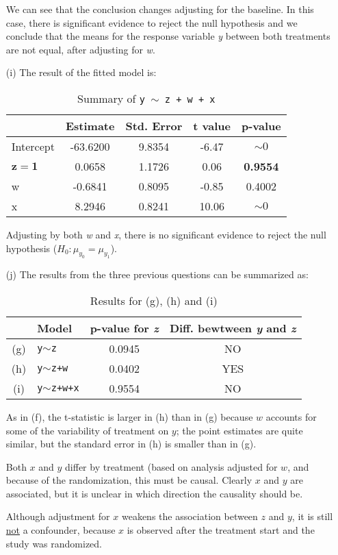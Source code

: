 \documentclass[11pt,a4paper]{article}
\begin{document}
\begin{enumerate}
We can see that the conclusion changes adjusting for the baseline. In this case, there is significant evidence to 
reject the null hypothesis and we conclude that the means for the response variable \emph{y} between both treatments are not equal, 
after adjusting for \emph{w}.

\item[(i)]
The result of the fitted model is:
\begin{table}[h!]
\centering
\begin{tabular}{lcccc}
  \hline
 & Estimate & Std. Error & t value & p-value \\ 
  \hline
Intercept & -63.6200 & 9.8354 & -6.47 & $\sim 0$ \\ 
 $\mathbf{z=1}$ & 0.0658 & 1.1726 & 0.06 & \textbf{0.9554} \\ 
  w & -0.6841 & 0.8095 & -0.85 & 0.4002 \\ 
  x & 8.2946 & 0.8241 & 10.06 & $\sim 0$ \\ 
   \hline
\end{tabular}
\caption{Summary of \texttt{y $\sim$ z + w + x} }
\end{table}

Adjusting by both \emph{w} and \emph{x}, there is no significant evidence to reject the null hypothesis ($H_0:\mu_{y_0} =\mu_{y_1}$). 

\item[(j)]
The results from the three previous questions can be summarized as:

\begin{table}[h!]
\centering
\begin{tabular}{clcc}
\hline
 & Model & p-value for \emph{z} & Diff. bewtween \emph{y} and \emph{z}\\
\hline
(g) & \texttt{y$\sim$z} & 0.0945 & NO\\
(h) & \texttt{y$\sim$z+w} & 0.0402 & YES\\
(i) & \texttt{y$\sim$z+w+x} & 0.9554 & NO\\
\hline
\end{tabular}
\caption{Results for (g), (h) and (i)}
\end{table}

As in (f), the t-statistic is larger in (h) than in (g) because $w$ accounts for some of the variability of treatment on 
$y$; the point estimates are quite similar, but the standard error in (h) is smaller than in (g).

Both $x$ and $y$ differ by treatment (based on analysis adjusted for $w$, and because of the randomization, this
must be causal. Clearly $x$ and $y$ are associated, but it is unclear in which direction the causality should be.

Although adjustment for $x$ weakens the association between $z$ and $y$, it is still {\underline{not}} a confounder, because $x$ is
observed after the treatment start and the study was randomized. 
\end{enumerate}
\end{document}
